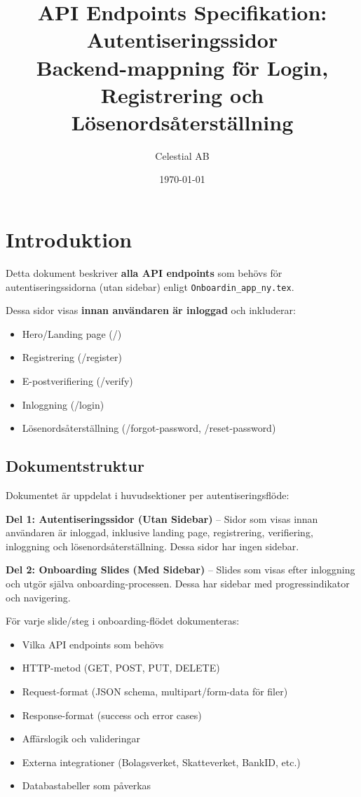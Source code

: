 \documentclass[12pt,a4paper]{article}
\title{\textbf{API Endpoints Specifikation: Autentiseringssidor} \\ \large Backend-mappning för Login, Registrering och Lösenordsåterställning}
\author{Celestial AB}
\date{\today}
\begin{document}
\maketitle
\tableofcontents
\newpage

\section{Introduktion}

Detta dokument beskriver \textbf{alla API endpoints} som behövs för autentiseringssidorna (utan sidebar) enligt \texttt{Onboardin\_app\_ny.tex}.

Dessa sidor visas \textbf{innan användaren är inloggad} och inkluderar:
\begin{itemize}[noitemsep]
  \item Hero/Landing page (/)
  \item Registrering (/register)
  \item E-postverifiering (/verify)
  \item Inloggning (/login)
  \item Lösenordsåterställning (/forgot-password, /reset-password)
\end{itemize}

\subsection{Dokumentstruktur}

Dokumentet är uppdelat i huvudsektioner per autentiseringsflöde:

\textbf{Del 1: Autentiseringssidor (Utan Sidebar)} -- Sidor som visas innan användaren är inloggad, inklusive landing page, registrering, verifiering, inloggning och lösenordsåterställning. Dessa sidor har ingen sidebar.

\textbf{Del 2: Onboarding Slides (Med Sidebar)} -- Slides som visas efter inloggning och utgör själva onboarding-processen. Dessa har sidebar med progressindikator och navigering.

För varje slide/steg i onboarding-flödet dokumenteras:
\begin{itemize}[noitemsep]
  \item Vilka API endpoints som behövs
  \item HTTP-metod (GET, POST, PUT, DELETE)
  \item Request-format (JSON schema, multipart/form-data för filer)
  \item Response-format (success och error cases)
  \item Affärslogik och valideringar
  \item Externa integrationer (Bolagsverket, Skatteverket, BankID, etc.)
  \item Databastabeller som påverkas
\end{itemize}
\end{document}
